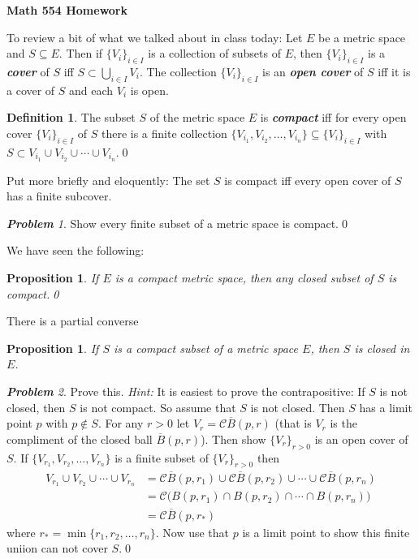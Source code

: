 \documentclass[11pt]{amsart}
\author{Ralph Howard}
\date{\today}
\title[]{}
\newcommand{\bi}[1]{{\bf\itshape #1\/}}  %
\renewcommand{\(}{\left(}
\renewcommand{\)}{\right)}
\renewcommand{\[}{\left[}
\renewcommand{\]}{\right]}
\newtheorem{prop}[thm]{Proposition}
\theoremstyle{definition}
\newtheorem{defn}[thm]{Definition}
\theoremstyle{remark}
\newtheorem{prob}{{\bf Problem}}
\newcommand{\cd}{,\dots,}      %
\newcommand{\ol}{\overline}   %
\newcommand{\hint}{{\emph{Hint:} }}
\begin{document}
 
 
 
 \centerline{\LARGE\bf Math 554 \hfill Homework }\bigskip
 
To review a bit of what we talked about in class today: Let $E$ be a
metric space and $S\subseteq E$.  Then if $\{V_i\}_{i\in I}$ is a
collection of subsets of $E$, then $\{V_i\}_{i\in I}$ is a \bi{cover} of
$S$ iff $S\subset \bigcup_{i\in I}V_i$.  The collection $\{V_i\}_{i\in
I}$ is an \bi{open cover} of $S$ iff it is a cover of $S$ and each
$V_i$ is open.

\begin{defn}
The subset $S$ of the metric space $E$ is \bi{compact} iff for every 
open cover $\{V_i\}_{i\in I}$ of $S$ there is a finite collection
$\{V_{i_1},V_{i_2}\cd V_{i_n}\}\subseteq \{V_i\}_{i\in I}$
with $S\subset V_{i_1}\cup V_{i_2}\cup\cdots \cup V_{i_n}$.\qed
\end{defn}

Put more briefly and eloquently:  The set $S$ is compact iff every
open cover of $S$ has a finite subcover. 


\begin{prob}
Show every finite subset of a metric space is compact.\qed
\end{prob}

We have seen the following:

\begin{prop}
If $E$ is a compact metric space, then any closed subset of $S$ is compact.\qed
\end{prop}


There is a partial converse

\begin{prop}
If $S$ is a compact subset of a metric space $E$, then $S$ is closed
in $E$.
\end{prop}

\begin{prob}
Prove this. \hint It is easiest to prove the contrapositive:  If $S$
is not closed, then $S$ is not compact.  So assume that $S$ is not
closed.  Then $S$ has a limit point $p$ with $p\notin S$.  For any
$r>0$ let $V_r= \mathcal C \ol{B}(p,r)$ (that is $V_r$ is the
compliment of the closed ball $\ol{B}(p,r)$).  Then show
$\{V_r\}_{r>0}$ is an open cover of $S$.  If 
$\{V_{r_1},V_{r_2}\cd V_{r_n}\}$ is a finite subset of $\{V_r\}_{r>0}$
then 
\begin{align*}
V_{r_1}\cup V_{r_2}\cup \cdots \cup V_{r_n}
&=\mathcal C \ol B(p,r_1)\cup \mathcal C \ol B(p,r_2)\cup \cdots \cup 
\mathcal C \ol B(p,r_n)\\
&= \mathcal C \Big(B(p,r_1)\cap B(p,r_2)\cap \cdots \cap B(p,r_n)
\Big)\\
&=\mathcal C \ol{B}(p,r_*)
\end{align*}
where 
$
r_*=\min\{ r_1,r_2\cd r_n\}.
$
Now use that $p$ is a limit point to show this finite uniion can not
cover $S$.\qed
\end{prob}
\end{document}
